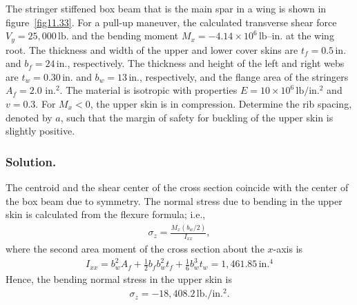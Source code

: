 \documentclass{AeroStructure-ERJohnson}
\begin{document}
\begin{example}\label{ex11.5}The stringer stiffened box beam that is the main spar in a wing is shown in figure~\ref{fig11.33}. For a pull-up maneuver, the calculated transverse shear force $V_{y}=25{,}000\,\mathrm{lb}$. and the bending moment $M_{x}=-4.14 \times 10^{6}\,\textrm{lb}$--$\mathrm{in}$.\vadjust{\vspace*{8pt}\pagebreak} at the wing root. The thickness and width of the upper and lower cover skins are $t_{f}=0.5\,\textrm{in}$. and $b_{f}=24\,\mathrm{in}$., respectively. The thickness and height of the left and right webs are $t_{w}=0.30\,\textrm{in}$. and $b_{w}=13\,\textrm{in}$., respectively, and the flange area of the stringers $A_{f}=2.0 \text { in.}^{2}$. The material is isotropic with properties $E=10 \times 10^{6}\,\mathrm{lb}/\text{in.}^{2}$ and $v=0.3$. For $M_{x}<0$, the upper skin is in compression. Determine the rib spacing, denoted by $a$, such that the margin of safety for buckling of the upper skin is slightly positive.


\subsubsection{Solution.} The centroid and the shear center of the cross section coincide with the center of the box beam due to symmetry. The normal stress due to bending in the upper skin is calculated from the flexure formula; i.e.,
\begin{align}
\sigma_{z}=\frac{M_{x}\left(b_{w}/2\right)}{I_{x x}}, \label{eq11.5.a}\tag{a}
\end{align}
where the second area moment of the cross section about the $x$-axis is
\begin{align}
I_{x x}=b_{w}^{2} A_{f}+\frac{1}{2} b_{f} b_{w}^{2} t_{f}+\frac{1}{6} b_{w}^{3} t_{w}=1{,}461.85\,\mathrm{in}.^{4} \label{eq11.5.b}\tag{b}
\end{align}
Hence, the bending normal stress in the upper skin is
\begin{align}
\sigma_{z}=-18{,}408.2\,\textrm{lb}./\text {in.}^{2}. \label{eq11.5.c}\tag{c}
\end{align}


\end{example}
\end{document}
